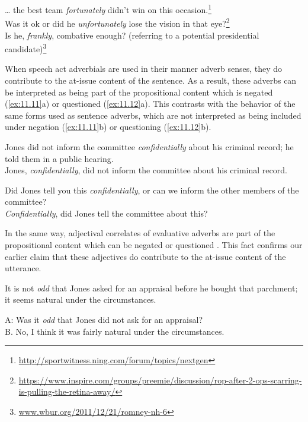 \ea \label{ex:11.7}
\ea  … the best team \textit{fortunately} didn’t win on this occasion.\footnote{\url{http://sportwitness.ning.com/forum/topics/nextgen}} \\
\ex Was it ok or did he \textit{unfortunately} lose the vision in that eye?\footnote{\url{https://www.inspire.com/groups/preemie/discussion/rop-after-2-ops-scarring-is-pulling-the-retina-away/}} \\
\ex Is he, \textit{frankly}, combative enough? (referring to a potential presidential candidate)\footnote{\href{http://www.wbur.org/2011/12/21/romney-nh-6}{{www.wbur.org/2011/12/21/romney-nh-6}}} 
                       \z
\z


When speech act adverbials are used in their manner adverb senses, they do contribute to the at-issue content of the sentence. As a result, these adverbs can be interpreted as being part of the propositional content which is negated (\ref{ex:11.11}a) or questioned (\ref{ex:11.12}a). This contrasts with the behavior of the same forms used as sentence adverbs, which are not interpreted as being included under negation (\ref{ex:11.11}b) or questioning (\ref{ex:11.12}b).



\ea \label{ex:11.11}
\ea Jones did not inform the committee \textit{confidentially} about his criminal record; he told them in a public hearing.\\
\ex Jones, \textit{confidentially}, did not inform the committee about his criminal record.
                       \z
\z

\ea \label{ex:11.12}
\ea Did Jones tell you this \textit{confidentially}, or can we inform the other members of the committee?\\
\ex \textit{Confidentially}, did Jones tell the committee about this?
                       \z
\z



In the same way, adjectival correlates of evaluative adverbs are part of the propositional content which can be negated  or questioned . This fact confirms our earlier claim that these adjectives do contribute to the at-issue content of the utterance.



\ea \label{ex:11.17}
It is not \textit{odd} that Jones asked for an appraisal before he bought that parchment; it seems natural under the circumstances.
\z

\ea \label{ex:11.18}
A: Was it \textit{odd} that Jones did not ask for an appraisal?\\
B. No, I think it was fairly natural under the circumstances.
\z



